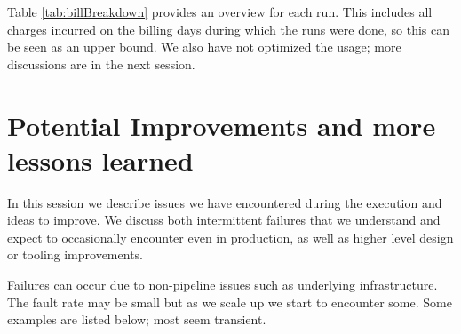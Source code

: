 Table \ref{tab:billBreakdown} provides an overview for each run.
This includes all charges incurred on the billing days during which the runs were done, so this can be seen as an upper bound.
We also have not optimized the usage; more discussions are in the next session.




\section{Potential Improvements and more lessons learned} \label{future}

In this session we describe issues we have encountered during the execution and ideas to improve.
We discuss both intermittent failures that we understand and expect to occasionally encounter even in production, as well as higher level design or tooling improvements.

Failures can occur due to non-pipeline issues such as underlying infrastructure.
The fault rate may be small but as we scale up we start to encounter some.
Some examples are listed below; most seem transient.


